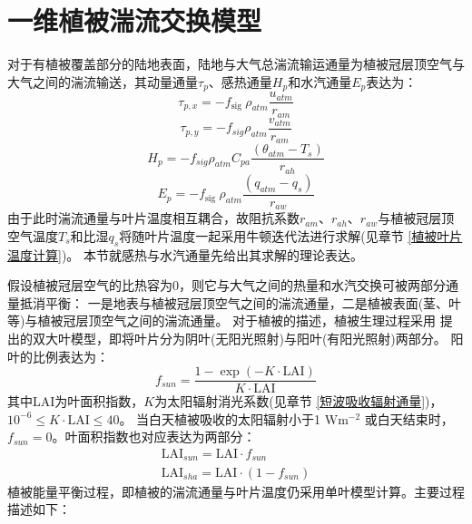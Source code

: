 \section{一维植被湍流交换模型}\label{一维植被湍流交换模型}
对于有植被覆盖部分的陆地表面，陆地与大气总湍流输运通量为植被冠层顶空气与大气之间的湍流输送，其动量通量$\tau_p$、感热通量$H_p$和水汽通量$E_p$表达为：
\begin{equation}
\tau_{p, x}=-f_{\text {sig }} \rho_{atm} \frac{u_{atm}}{r_{a m}}
\end{equation}
\begin{equation}
\tau_{p, y}=-f_{sig} \rho_{atm} \frac{v_{atm}}{r_{a m}}
\end{equation}
\begin{equation}
H_{p}=-f_{sig} \rho_{atm} C_{p a} \frac{\left(\theta_{atm}-T_{s}\right)}{r_{a h}}
\end{equation}
\begin{equation}
E_{p}=-f_{\text {sig }} \rho_{atm} \frac{\left(q_{atm}-q_{s}\right)}{r_{a w}}
\end{equation}
由于此时湍流通量与叶片温度相互耦合，故阻抗系数$r_{am}$、$r_{ah}$、$r_{aw}$与植被冠层顶空气温度$T_s$和比湿$q_s$将随叶片温度一起采用牛顿迭代法进行求解(见章节 \ref{植被叶片温度计算})。
本节就感热与水汽通量先给出其求解的理论表达。


假设植被冠层空气的比热容为0，则它与大气之间的热量和水汽交换可被两部分通量抵消平衡：
一是地表与植被冠层顶空气之间的湍流通量，二是植被表面(茎、叶等)与植被冠层顶空气之间的湍流通量。
对于植被的描述，植被生理过程采用 \citet{dai2004two}提出的双大叶模型，即将叶片分为阴叶(无阳光照射)与阳叶(有阳光照射)两部分。
阳叶的比例表达为：
\begin{equation}
f_{sun}=\frac{1-\exp (-K \cdot \text {LAI})}{K \cdot \text {LAI}}
\end{equation}
其中LAI为叶面积指数，$K$为太阳辐射消光系数(见章节 \ref{短波吸收辐射通量})，${10}^{-6}\le K \cdot \text {LAI}\le40$。
当白天植被吸收的太阳辐射小于1 $\mathrm{W m^{-2}}$ 或白天结束时，$f_{sun}=0$。叶面积指数也对应表达为两部分：
\begin{equation}
\begin{array}{c} \text {LAI}_{sun}= \text {LAI} \cdot f_{sun} \\ \text {LAI}_{sha}=\text {LAI} \cdot \left(1-f_{sun}\right)\end{array}
\end{equation}
植被能量平衡过程，即植被的湍流通量与叶片温度仍采用单叶模型计算。主要过程描述如下：


